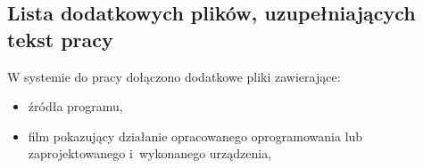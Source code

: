 \documentclass[a4paper,twoside,12pt]{book}
\begin{document}
\begin{appendices}



\chapter{Lista dodatkowych plików, uzupełniających tekst pracy} 


W systemie do pracy dołączono dodatkowe pliki zawierające:
\begin{itemize}
\item źródła programu,
\item film pokazujący działanie opracowanego oprogramowania lub zaprojektowanego i~wykonanego urządzenia,
\end{itemize}


\listoffigures
{}
\listoftables
{}

\end{appendices}
\end{document}

